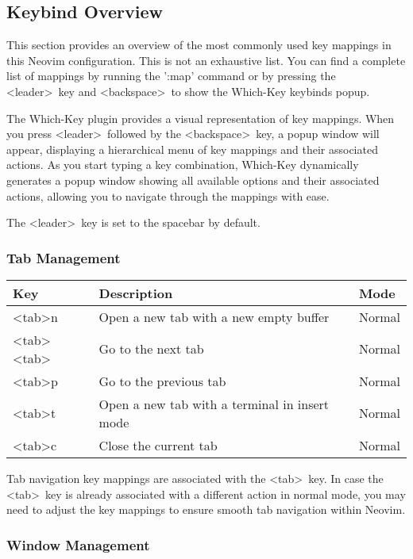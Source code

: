 \documentclass{article}
\newcommand{\tl}{\textless}
\newcommand{\tg}{\textgreater}
\begin{document}
\subsection{Keybind Overview}\label{sec:keybind_overview}

This section provides an overview of the most commonly used key mappings in 
this Neovim configuration. This is not an exhaustive list. You can find a 
complete list of mappings by running the ':map' command or by pressing the 
\tl leader\tg\ key and \tl backspace\tg\ to show the Which-Key keybinds popup.

The Which-Key plugin provides a visual representation of key mappings. When 
you press \tl leader\tg\ followed by the \tl backspace\tg\ key, a popup window 
will appear, displaying a hierarchical menu of key mappings and their associated 
actions. 
As you start typing a key combination, Which-Key dynamically generates a popup 
window showing all available options and their associated actions, allowing 
you to navigate through the mappings with ease.

The \tl leader\tg\ key is set to the spacebar by default.

\subsubsection{Tab Management}

\begin{tabular}{|l|l|l|}
\hline
Key & Description & Mode \\
\hline
\tl tab\tg n & Open a new tab with a new empty buffer & Normal \\
\tl tab\tg \tl tab\tg & Go to the next tab & Normal \\
\tl tab\tg p & Go to the previous tab & Normal \\
\tl tab\tg t & Open a new tab with a terminal in insert mode & Normal \\
\tl tab\tg c & Close the current tab & Normal \\
\hline
\end{tabular}

Tab navigation key mappings are associated with the \tl tab\tg\ key. In case the 
\tl tab\tg\ key is already associated with a different action in normal mode, 
you may need to adjust the key mappings to ensure smooth tab navigation within 
Neovim.

\subsubsection{Window Management}
\end{document}
